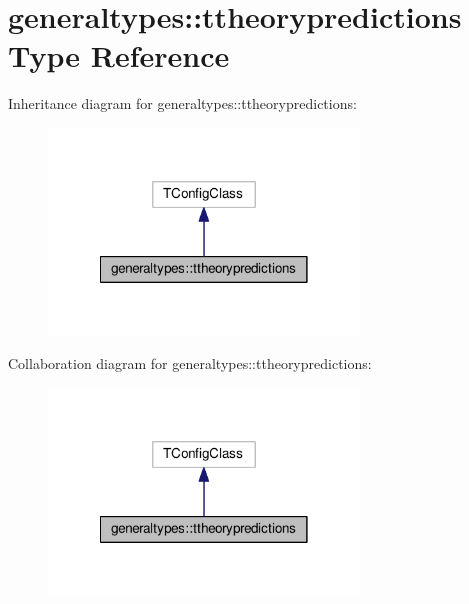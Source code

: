 \hypertarget{structgeneraltypes_1_1ttheorypredictions}{}\section{generaltypes\+:\+:ttheorypredictions Type Reference}
\label{structgeneraltypes_1_1ttheorypredictions}


Inheritance diagram for generaltypes\+:\+:ttheorypredictions\+:
\nopagebreak
\begin{figure}[H]
\begin{center}
\leavevmode
\includegraphics[width=234pt]{structgeneraltypes_1_1ttheorypredictions__inherit__graph}
\end{center}
\end{figure}


Collaboration diagram for generaltypes\+:\+:ttheorypredictions\+:
\nopagebreak
\begin{figure}[H]
\begin{center}
\leavevmode
\includegraphics[width=234pt]{structgeneraltypes_1_1ttheorypredictions__coll__graph}
\end{center}
\end{figure}
